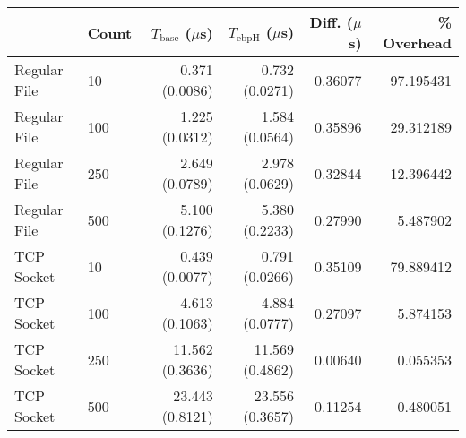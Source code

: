\begin{tabular}{>{\ttfamily}llrrrr}
\toprule
\multicolumn{1}{l}{Type} & Count & $T_\text{base}$ ($\mu$s) & $T_\text{ebpH}$ ($\mu$s) &  Diff. ($\mu$s) &  \% Overhead \\
\midrule
            Regular File &    10 &           0.371 (0.0086) &           0.732 (0.0271) &         0.36077 &    97.195431 \\
            Regular File &   100 &           1.225 (0.0312) &           1.584 (0.0564) &         0.35896 &    29.312189 \\
            Regular File &   250 &           2.649 (0.0789) &           2.978 (0.0629) &         0.32844 &    12.396442 \\
            Regular File &   500 &           5.100 (0.1276) &           5.380 (0.2233) &         0.27990 &     5.487902 \\
              TCP Socket &    10 &           0.439 (0.0077) &           0.791 (0.0266) &         0.35109 &    79.889412 \\
              TCP Socket &   100 &           4.613 (0.1063) &           4.884 (0.0777) &         0.27097 &     5.874153 \\
              TCP Socket &   250 &          11.562 (0.3636) &          11.569 (0.4862) &         0.00640 &     0.055353 \\
              TCP Socket &   500 &          23.443 (0.8121) &          23.556 (0.3657) &         0.11254 &     0.480051 \\
\bottomrule
\end{tabular}
